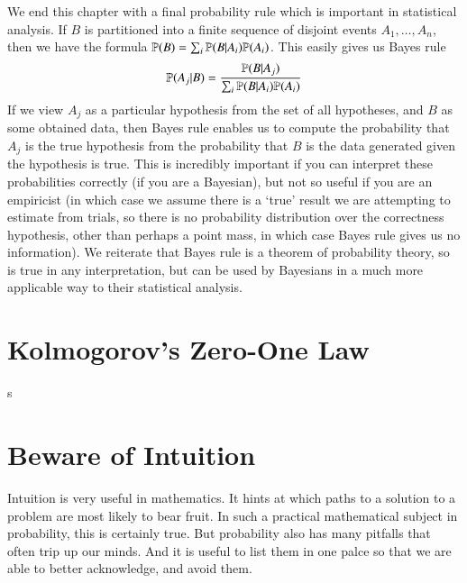 We end this chapter with a final probability rule which is important in statistical analysis. If $B$ is partitioned into a finite sequence of disjoint events $A_1, \dots, A_n$, then we have the formula $\mathbb{P}(B) = \sum_i \mathbb{P}(B | A_i) \mathbb{P}(A_i)$. This easily gives us Bayes rule
%
\[ \mathbb{P}(A_j | B) = \frac{\mathbb{P}(B | A_j)}{\sum_i \mathbb{P}(B | A_i) \mathbb{P}(A_i)} \]
%
If we view $A_j$ as a particular hypothesis from the set of all hypotheses, and $B$ as some obtained data, then Bayes rule enables us to compute the probability that $A_j$ is the true hypothesis from the probability that $B$ is the data generated given the hypothesis is true. This is incredibly important if you can interpret these probabilities correctly (if you are a Bayesian), but not so useful if you are an empiricist (in which case we assume there is a `true' result we are attempting to estimate from trials, so there is no probability distribution over the correctness hypothesis, other than perhaps a point mass, in which case Bayes rule gives us no information). We reiterate that Bayes rule is a theorem of probability theory, so is true in any interpretation, but can be used by Bayesians in a much more applicable way to their statistical analysis.

\section{Kolmogorov's Zero-One Law}

s

\section{Beware of Intuition}

Intuition is very useful in mathematics. It hints at which paths to a solution to a problem are most likely to bear fruit. In such a practical mathematical subject in probability, this is certainly true. But probability also has many pitfalls that often trip up our minds. And it is useful to list them in one palce so that we are able to better acknowledge, and avoid them.


